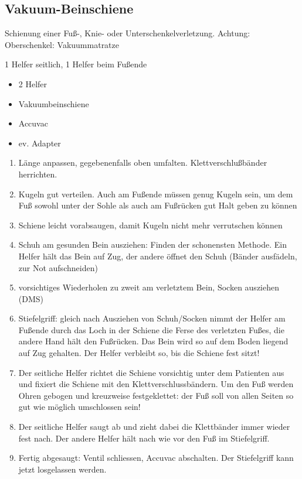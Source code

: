 \subsection{Vakuum-Beinschiene}

Schienung einer Fu{\ss}-, Knie- oder Unterschenkelverletzung. Achtung:
Oberschenkel: Vakuummatratze

1 Helfer seitlich, 1 Helfer beim Fu{\ss}ende



\begin{itemize}
    \item 2 Helfer
    \item Vakuumbeinschiene
    \item Accuvac
    \item ev. Adapter
\end{itemize}



\begin{enumerate}
    \item L\"ange anpassen, gegebenenfalls oben umfalten.
    Klettverschlu{\ss}b\"ander herrichten.
    \item Kugeln gut verteilen. Auch am Fu{\ss}ende m\"ussen genug Kugeln
    sein, um dem Fu{\ss} sowohl unter der Sohle als auch am Fu{\ss}r\"ucken
    gut Halt geben zu k\"onnen
    \item Schiene leicht vorabsaugen, damit Kugeln nicht mehr verrutschen
    k\"onnen
    \item Schuh am gesunden Bein ausziehen: Finden der schonensten Methode.
    Ein Helfer h\"alt das Bein auf Zug, der andere \"offnet den Schuh
    (B\"ander ausf\"adeln, zur Not aufschneiden)
    \item vorsichtiges Wiederholen zu zweit am verletztem Bein, Socken
    ausziehen (DMS)
    \item Stiefelgriff: gleich nach Ausziehen von Schuh/Socken nimmt der
    Helfer am Fu{\ss}ende durch das Loch in der Schiene die Ferse des
    verletzten Fu{\ss}es, die andere Hand h\"alt den Fu{\ss}r\"ucken. Das
    Bein wird so auf dem Boden liegend auf Zug gehalten. Der Helfer
    verbleibt so, bis die Schiene fest sitzt!
    \item Der seitliche Helfer richtet die Schiene vorsichtig unter dem
    Patienten aus und fixiert die Schiene mit den Klettverschlussb\"andern.
    Um den Fu{\ss} werden Ohren gebogen und kreuzweise festgeklettet: der
    Fu{\ss} soll von allen Seiten so gut wie m\"oglich umschlossen sein!
    \item Der seitliche Helfer saugt ab und zieht dabei die Klettb\"ander
    immer wieder fest nach. Der andere Helfer h\"alt nach wie vor den
    Fu{\ss} im Stiefelgriff.
    \item Fertig abgesaugt: Ventil schliessen, Accuvac abschalten. Der
    Stiefelgriff kann jetzt losgelassen werden.
\end{enumerate}

